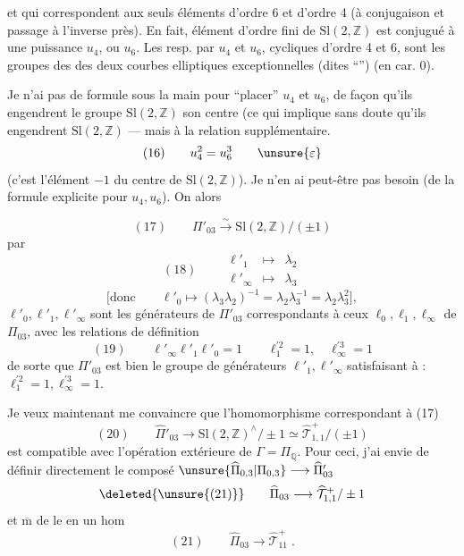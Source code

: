 
et qui correspondent aux seuls éléments d'ordre 6 et d'ordre 4 (à conjugaison et passage à l'inverse près). En fait,  élément d'ordre fini de $\mathrm{Sl}(2,\mathbb Z)$ est conjugué à une puissance   $u_4$, ou $u_6$. Les   resp. par $u_4$ et $u_6$, cycliques d'ordre 4 et 6, sont les groupes des  des deux courbes elliptiques exceptionnelles (dites ``'') (en car. 0).

 Je n'ai pas de formule sous la main pour ``placer''  $u_4$ et $u_6$, de façon qu'ils engendrent le groupe $\mathrm{Sl}(2,\mathbb Z)$  son centre (ce qui implique sans doute qu'ils engendrent $\mathrm{Sl}(2,\mathbb Z)$ --- mais  à la relation supplémentaire. 
\[
(16)\qquad u_4^2=u_6^3\qquad\unsure{\varepsilon}
\]
(c'est   l'élément $-1$ du centre de $\mathrm{Sl}(2,\mathbb Z)$). Je n'en ai peut-être pas besoin (de la formule explicite pour $u_4,u_6$). On  alors


\[
(17)\qquad \Pi'_{03}\xrightarrow{\sim}\mathrm{Sl}(2,\mathbb Z)/(\pm1)
\]
par
\[
(18)\qquad
\begin{array}{rcl}
\ell'_1&\longmapsto&\lambda_2\\
\ell'_\infty&\longmapsto&\lambda_3
\end{array}
\]
\[
\bigl[\text{donc}\qquad\ell'_0\longmapsto(\lambda_3\lambda_2)^{-1}
=\lambda_2\lambda_3^{-1}=\lambda_2\lambda_3^2\bigr],
\]
 $\ell'_0,\ell'_1,\ell'_\infty$ sont les générateurs de $\Pi'_{03}$ correspondants à ceux $\ell_0,\ell_1,\ell_\infty$ de $\Pi_{03}$, avec les relations de définition
\[
(19)\qquad\ell'_\infty\ell'_1\ell'_0=1\qquad
\ell_1^{\prime 2}=1,\quad\ell_\infty^{\prime 3}=1
\]
de sorte que $\Pi'_{03}$ est bien le groupe  de générateurs $\ell'_1,\ell'_\infty$ satisfaisant à : $\ell_1^{\prime 2}=1,\ell_\infty^{\prime 3}=1$.

Je veux maintenant me convaincre que l'homomorphisme correspondant à (17)
\[
(20)\qquad\widehat{\Pi}'_{03}\longrightarrow
\mathrm{Sl}(2,\mathbb Z)^\wedge/\pm1\simeq
\widehat{\mathcal T}_{1,1}^{+}/(\pm1)
\]
est compatible avec l'opération extérieure de $\Gamma=\Pi_{\mathbb Q}$. Pour ceci, j'ai envie de définir directement le composé  $\unsure{\widehat{\Pi}_{0,3}|\Pi_{0,3}}\longrightarrow\widehat{\Pi}'_{03}$
\[
\text{\deleted{\unsure{(21)}}}\qquad\widehat{\Pi}_{03}\longrightarrow\widehat{\mathcal T}_{1,1}^{+}/\pm1
\]
et $\overline{\mathrm m}$ de le  en un hom
\[
(21)\qquad\widehat{\Pi}_{03}\longrightarrow\widehat{\mathcal T}_{11}^{+}\;.
\]

